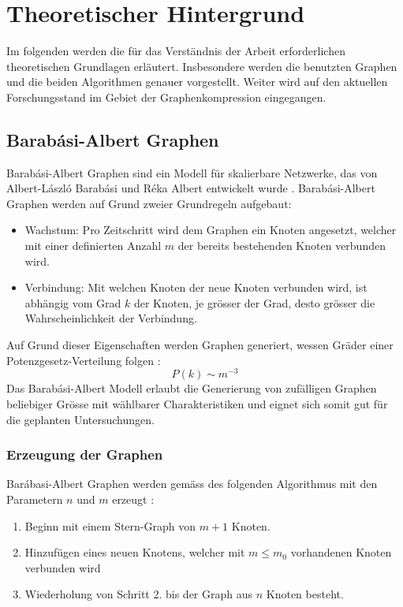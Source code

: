 \documentclass{ffhsthesis}
\begin{document}
\chapter{Theoretischer Hintergrund} %
Im folgenden werden die für das Verständnis der Arbeit erforderlichen theoretischen Grundlagen erläutert. Insbesondere werden die benutzten Graphen und die beiden Algorithmen genauer vorgestellt. Weiter wird auf den aktuellen Forschungsstand im Gebiet der Graphenkompression eingegangen.
\section{Barabási-Albert Graphen}
Barabási-Albert Graphen sind ein Modell für skalierbare Netzwerke, das von Albert-László Barabási und Réka Albert entwickelt wurde \cite{albert2002statistical}. Barabási-Albert Graphen werden auf Grund zweier Grundregeln aufgebaut: 
\begin{itemize}
    \item Wachstum: Pro Zeitschritt wird dem Graphen ein Knoten angesetzt, welcher mit einer definierten Anzahl $m$ der bereits bestehenden Knoten verbunden wird.
    \item Verbindung: Mit welchen Knoten der neue Knoten verbunden wird, ist abhängig vom Grad $k$ der Knoten, je grösser der Grad, desto grösser die Wahrscheinlichkeit der Verbindung.
\end{itemize}
Auf Grund dieser Eigenschaften werden Graphen generiert, wessen Gräder einer Potenz\-gesetz-Verteilung folgen \cite{barabasi1999emergence}:
\begin{equation}
    P(k) \sim m^{-3}
    \label{eq:potenzgesetz}
\end{equation}
Das Barabási-Albert Modell erlaubt die Generierung von zufälligen Graphen beliebiger Grösse mit wählbarer Charakteristiken und eignet sich somit gut für die geplanten Untersuchungen.
\subsection{Erzeugung der Graphen}
\label{ch:erzeug}
Barábasi-Albert Graphen werden gemäss des folgenden Algorithmus mit den Parametern $n$ und $m$ erzeugt \cite{albert2002statistical}:
\begin{enumerate}
    \item Beginn mit einem Stern-Graph von $m+1$ Knoten.
    \item Hinzufügen eines neuen Knotens, welcher mit $m \leq m_{0}$ vorhandenen Knoten verbunden wird
    \item Wiederholung von Schritt 2. bis der Graph aus $n$ Knoten besteht.
\end{enumerate}
\end{document}
